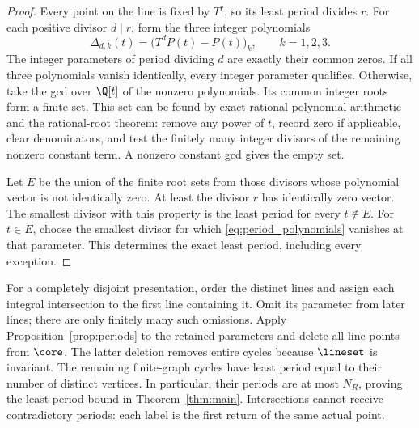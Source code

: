\begin{proof}
Every point on the line is fixed by \(T^r\), so its least period
divides \(r\). For each positive divisor \(d\mid r\), form the
three integer polynomials
\begin{equation}\label{eq:period_polynomials}
 \Delta_{d,k}(t)=\bigl(T^dP(t)-P(t)\bigr)_k,
 \qquad k=1,2,3.
\end{equation}
The integer parameters of period dividing \(d\) are exactly their
common zeros. If all three polynomials vanish identically, every
integer parameter qualifies. Otherwise, take the gcd over \(\Q[t]\)
of the nonzero polynomials. Its common integer roots form a finite
set. This set can be found by exact rational polynomial arithmetic
and the rational-root theorem: remove any power of \(t\), record
zero if applicable, clear denominators, and test the finitely many
integer divisors of the remaining nonzero constant term. A nonzero
constant gcd gives the empty set.

Let \(E\) be the union of the finite root sets from those divisors
whose polynomial vector is not identically zero. At least the divisor
\(r\) has identically zero vector. The smallest divisor with this
property is the least period for every \(t\notin E\). For
\(t\in E\), choose the smallest divisor for which
\eqref{eq:period_polynomials} vanishes at that parameter. This
determines the exact least period, including every exception.
\end{proof}

For a completely disjoint presentation, order the distinct lines and
assign each integral intersection to the first line containing it.
Omit its parameter from later lines; there are only finitely many such
omissions. Apply Proposition~\ref{prop:periods} to the retained
parameters and delete all line points from \(\core\). The latter
deletion removes entire cycles because \(\lineset\) is invariant.
The remaining finite-graph cycles have least period equal to their
number of distinct vertices. In particular, their periods are at most
\(N_R\), proving the least-period bound in
Theorem~\ref{thm:main}. Intersections cannot receive contradictory
periods: each label is the first return of the same actual point.

